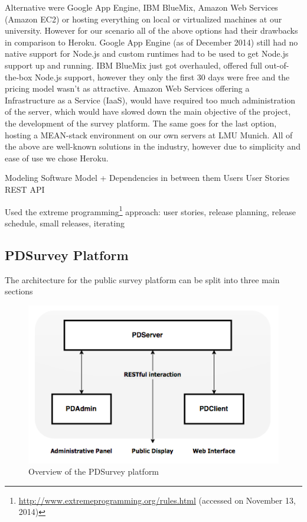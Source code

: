 		Alternative were Google App Engine, IBM BlueMix, Amazon Web Services (Amazon EC2) or hosting everything on local or virtualized machines at our university. However for our scenario all of the above options had their drawbacks in comparison to Heroku. Google App Engine (as of December 2014) still had no native support for Node.js and custom runtimes had to be used to get Node.js support up and running. IBM BlueMix just got overhauled, offered full out-of-the-box Node.js support, however they only the first 30 days were free and the pricing model wasn't as attractive. Amazon Web Services offering a Infrastructure as a Service (IaaS), would have required too much administration of the server, which would have slowed down the main objective of the project, the development of the survey platform. The same goes for the last option, hosting a MEAN-stack environment on our own servers at LMU Munich. All of the above are well-known solutions in the industry, however due to simplicity and ease of use we chose Heroku.






\clearpage

\label{sec:implementation:modeling}

Modeling
	Software Model
	+ Dependencies in between them
	Users
	User Stories
	REST API


Used the extreme programming\footnote{\url{http://www.extremeprogramming.org/rules.html} (accessed on November 13, 2014)} approach: user stories, release planning, release schedule, small releases, iterating




\subsection{PDSurvey Platform}

	The architecture for the public survey platform can be split into three main sections

	\begin{figure}%
	    \begin{center}
	        \includegraphics[width=.7\columnwidth]{img/4_implementation/4-overview}
	    \end{center}
	 \caption{Overview of the PDSurvey platform}
	 \label{fig:4-pdsurvey-platform}
	\end{figure}



